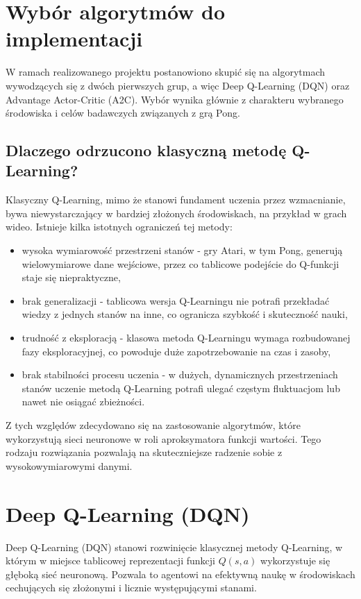 \documentclass[a4paper, 12pt]{article}
\numberwithin{equation}{section}
\begin{document}
    \section{Wybór algorytmów do implementacji}
    W ramach realizowanego projektu postanowiono skupić się na algorytmach wywodzących się z dwóch pierwszych grup, a więc Deep Q-Learning (DQN) oraz Advantage Actor-Critic (A2C). Wybór wynika głównie z charakteru wybranego środowiska i celów badawczych związanych z grą Pong.
    \subsection{Dlaczego odrzucono klasyczną metodę Q-Learning?}
    Klasyczny Q-Learning, mimo że stanowi fundament uczenia przez wzmacnianie, bywa niewystarczający w bardziej złożonych środowiskach, na przykład w grach wideo. Istnieje kilka istotnych ograniczeń tej metody:
    \begin{itemize}
        \item wysoka wymiarowość przestrzeni stanów - gry Atari, w tym Pong, generują wielowymiarowe dane wejściowe, przez co tablicowe podejście do Q-funkcji staje się niepraktyczne,
        \item brak generalizacji - tablicowa wersja Q-Learningu nie potrafi przekładać wiedzy z jednych stanów na inne, co ogranicza szybkość i skuteczność nauki,
        \item trudność z eksploracją - klasowa metoda Q-Learningu wymaga rozbudowanej fazy eksploracyjnej, co powoduje duże zapotrzebowanie na czas i zasoby,
        \item brak stabilności procesu uczenia - w dużych, dynamicznych przestrzeniach stanów uczenie metodą Q-Learning potrafi ulegać częstym fluktuacjom lub nawet nie osiągać zbieżności. 
    \end{itemize}
    Z tych względów zdecydowano się na zastosowanie algorytmów, które wykorzystują sieci neuronowe w roli aproksymatora funkcji wartości. Tego rodzaju rozwiązania pozwalają na skuteczniejsze radzenie sobie z wysokowymiarowymi danymi. \cite{mnih2015nature}
    \section{Deep Q-Learning (DQN)}
    Deep Q-Learning (DQN) stanowi rozwinięcie klasycznej metody Q-Learning, w którym w miejsce tablicowej reprezentacji funkcji \( Q(s,a) \) wykorzystuje się głęboką sieć neuronową. Pozwala to agentowi na efektywną naukę w środowiskach cechujących się złożonymi i licznie występującymi stanami.
\end{document}
